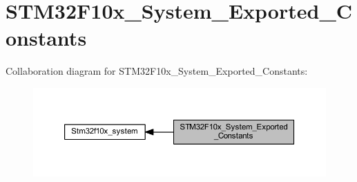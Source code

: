 \hypertarget{group___s_t_m32_f10x___system___exported___constants}{}\section{S\+T\+M32\+F10x\+\_\+\+System\+\_\+\+Exported\+\_\+\+Constants}
\label{group___s_t_m32_f10x___system___exported___constants}
Collaboration diagram for S\+T\+M32\+F10x\+\_\+\+System\+\_\+\+Exported\+\_\+\+Constants\+:
\nopagebreak
\begin{figure}[H]
\begin{center}
\leavevmode
\includegraphics[width=350pt]{group___s_t_m32_f10x___system___exported___constants}
\end{center}
\end{figure}
